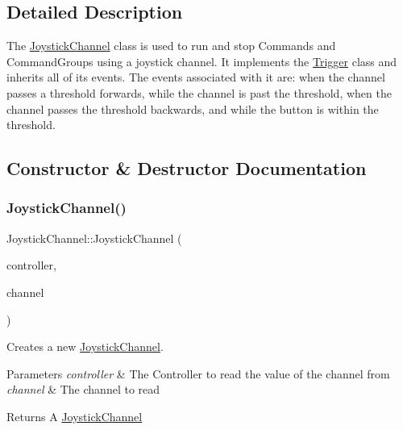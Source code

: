 \subsection{Detailed Description}
The \mbox{\hyperlink{classlib_iterative_robot_1_1_joystick_channel}{Joystick\+Channel}} class is used to run and stop Commands and Command\+Groups using a joystick channel. It implements the \mbox{\hyperlink{classlib_iterative_robot_1_1_trigger}{Trigger}} class and inherits all of its events. The events associated with it are\+: when the channel passes a threshold forwards, while the channel is past the threshold, when the channel passes the threshold backwards, and while the button is within the threshold. 

\subsection{Constructor \& Destructor Documentation}
\mbox{\label{classlib_iterative_robot_1_1_joystick_channel_a75bf0fa44f1d1b06c263b42140d31bbe}} 
\subsubsection{\texorpdfstring{JoystickChannel()}{JoystickChannel()}}
{\footnotesize\ttfamily Joystick\+Channel\+::\+Joystick\+Channel (\begin{DoxyParamCaption}\item[{pros\+::\+Controller $\ast$}]{controller,  }\item[{pros\+::controller\+\_\+analog\+\_\+e\+\_\+t}]{channel }\end{DoxyParamCaption})}



Creates a new \mbox{\hyperlink{classlib_iterative_robot_1_1_joystick_channel}{Joystick\+Channel}}. 


\begin{DoxyParams}{Parameters}
{\em controller} & The Controller to read the value of the channel from \\
\hline
{\em channel} & The channel to read \\
\hline
\end{DoxyParams}
\begin{DoxyReturn}{Returns}
A \mbox{\hyperlink{classlib_iterative_robot_1_1_joystick_channel}{Joystick\+Channel}} 
\end{DoxyReturn}


